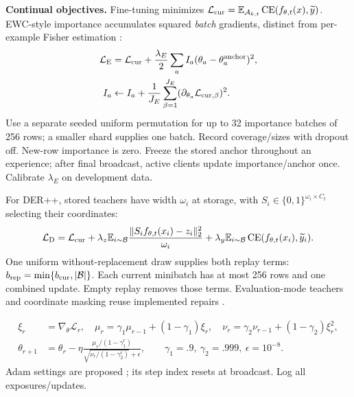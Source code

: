 \documentclass[10pt,a4paper]{article}
\newcommand{\CE}{\operatorname{CE}}
\begin{document}
\textbf{Continual objectives.} Fine-tuning minimizes $\mathcal L_{\rm cur}=\mathbb E_{\mathcal A_{k,t}}\CE(f_{\theta,t}(x),\widetilde y)$. EWC-style importance accumulates squared \emph{batch} gradients, distinct from per-example Fisher estimation \cite{ewc}:
\begin{equation}
\begin{aligned}
\mathcal L_{\rm E}&=\mathcal L_{\rm cur}+\frac{\lambda_E}{2}\sum_aI_a(\theta_a-\theta_a^{\rm anchor})^2,\\
I_a&\leftarrow I_a+\frac1{J_E}\sum_{\beta=1}^{J_E}(\partial_{\theta_a}\mathcal L_{{\rm cur},\beta})^2.
\end{aligned}
\label{eq:ewc}
\end{equation}
Use a separate seeded uniform permutation for up to 32 importance batches of 256 rows; a smaller shard supplies one batch. Record coverage/sizes with dropout off. New-row importance is zero. Freeze the stored anchor throughout an experience; after final broadcast, active clients update importance/anchor once. Calibrate $\lambda_E$ on development data.

For DER++, stored teachers have width $\omega_i$ at storage, with $S_i\in\{0,1\}^{\omega_i\times C_t}$ selecting their coordinates:
\begin{equation}
\mathcal L_{\rm D}=\mathcal L_{\rm cur}
+\lambda_z\mathbb E_{i\sim\mathcal B}\frac{\|S_if_{\theta,t}(x_i)-z_i\|_2^2}{\omega_i}
+\lambda_y\mathbb E_{i\sim\mathcal B}\CE(f_{\theta,t}(x_i),\widetilde y_i).
\label{eq:der}
\end{equation}
One uniform without-replacement draw supplies both replay terms: $b_{\rm rep}=\min\{b_{\rm cur},|\mathcal B|\}$. Each current minibatch has at most 256 rows and one combined update. Empty replay removes those terms. Evaluation-mode teachers and coordinate masking reuse implemented repairs \cite{der}.

\begin{equation}
\begin{aligned}
\xi_r&=\nabla_\theta\mathcal L_r,\quad\mu_r=\gamma_1\mu_{r-1}+(1-\gamma_1)\xi_r,\quad
\nu_r=\gamma_2\nu_{r-1}+(1-\gamma_2)\xi_r^2,\\
\theta_{r+1}&=\theta_r-\eta\frac{\mu_r/(1-\gamma_1^r)}{\sqrt{\nu_r/(1-\gamma_2^r)}+\epsilon},\qquad
\gamma_1=.9,\ \gamma_2=.999,\ \epsilon=10^{-8}.
\end{aligned}
\label{eq:adam}
\end{equation}
Adam settings are proposed \cite{adam}; its step index resets at broadcast. Log all exposures/updates.
\end{document}
